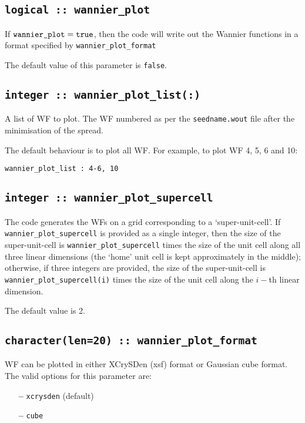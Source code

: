 \subsection[wannier\_plot]{\tt logical :: wannier\_plot}

If $\verb#wannier_plot#=\verb#true#$, then the code will write out the
Wannier functions in a format specified by \verb#wannier_plot_format#

The default value of this parameter is \verb#false#.


\subsection[wannier\_plot\_list]{\tt integer :: wannier\_plot\_list(:)}

 A list of WF to plot. The WF numbered
 as per the {\tt seedname.wout} file after the minimisation of the
 spread.

 The default behaviour is to plot all WF. For example,
 to plot WF 4, 5, 6 and 10:

 \verb#wannier_plot_list : 4-6, 10#


\subsection[wannier\_plot\_supercell]{\tt integer :: wannier\_plot\_supercell}

The code generates the WFs on a grid corresponding to a `super-unit-cell'.
If \verb#wannier_plot_supercell# is provided as a single integer,
then the size of the super-unit-cell is \verb#wannier_plot_supercell# times
the size of the unit cell along all three linear dimensions (the `home' unit cell
is kept approximately in the middle); otherwise, if three integers are
provided, the size of the super-unit-cell is \verb#wannier_plot_supercell(i)#
times the size of the unit cell along the $i-$th linear dimension.

The default value is 2.


\subsection[wannier\_plot\_format]{\tt character(len=20) :: wannier\_plot\_format}

WF can be plotted in either XCrySDen (xsf) format or Gaussian cube
format. The valid options for this parameter are:
\begin{itemize}
\item[{\bf --}] \verb#xcrysden# (default)
\item[{\bf --}] \verb#cube#
\end{itemize}

